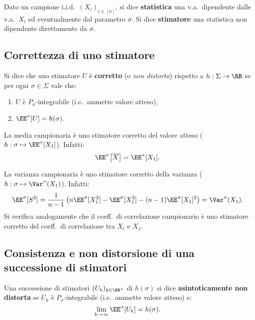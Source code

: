 \begin{multicols*}{2}
\begin{definition}
    Dato un campione i.i.d.~$(X_i)_{i \in [n]}$, si dice \textbf{statistica}
    una v.a.~dipendente dalle v.a.~$X_i$ ed eventualmente dal parametro $\sigma$.
    Si dice \textbf{stimatore} una statistica non dipendente direttamente da $\sigma$.
\end{definition}

\subsection{Correttezza di uno stimatore}

\begin{definition}
    Si dice che uno stimatore $U$ è \textbf{corretto} (o \textit{non distorto}) rispetto
    a $h : \Sigma \to \RR$ se per ogni $\sigma \in \Sigma$ vale che:
    \begin{enumerate}[(i.)]
        \item $U$ è $P_\sigma$-integrabile (i.e.~ammette valore atteso),
        \item $\EE^\sigma[U] = h(\sigma)$.
    \end{enumerate}
\end{definition}

\begin{remark}
    La media campionaria è uno stimatore corretto del valore atteso ($h : \sigma \mapsto \EE^\sigma[X_1]$). Infatti:
    \[
        \EE^\sigma\!\left[\overline{X}\right] = \EE^\sigma[X_1].
    \]
\end{remark}

\begin{remark}
    La varianza campionaria è uno stimatore corretto della varianza ($h : \sigma \mapsto \Var^\sigma(X_1)$). Infatti:
    \[
        \EE^\sigma[S^2] = \frac{1}{n-1} \left( n \EE^\sigma[X_1^2] - \EE^\sigma[X_1^2] - (n-1) \EE^\sigma[X_1]^2 \right) = \Var^\sigma(X_1).
    \]
    Si verifica analogamente che il coeff.~di correlazione campionario è uno stimatore corretto del
    coeff.~di correlazione tra $X_i$ e $X_j$.
\end{remark}

\subsection{Consistenza e non distorsione di una successione di stimatori}

\begin{definition}
    Una successione di stimatori $(U_k)_{k \in \NN^+}$ di $h(\sigma)$ si dice
    \textbf{asintoticamente non distorta} se $U_k$ è $P_\sigma$-integrabile
    (i.e.~ammette valore atteso) e:
    \[
        \lim_{k \to \infty} \EE^\sigma[U_k] = h(\sigma).
    \]
\end{definition}


\end{multicols*}
